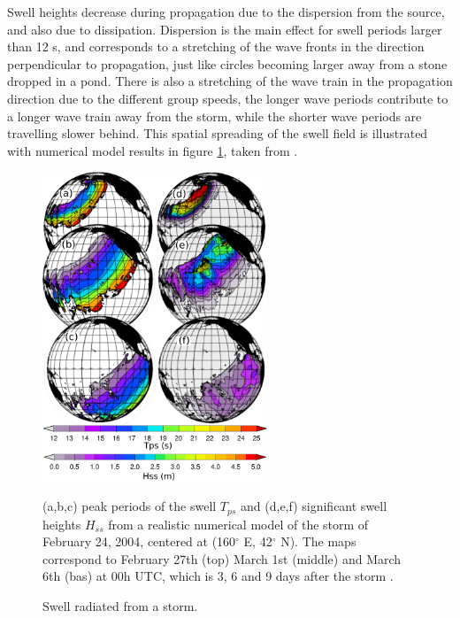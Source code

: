 Swell heights decrease during propagation due 
to the dispersion from the source, and also due to dissipation. Dispersion is the main effect for swell periods larger than 12 s, 
and corresponds to a stretching of the wave fronts in the direction perpendicular to propagation, just like circles becoming larger 
away from a stone dropped in a pond. There is also a stretching of the wave train in the propagation direction due to the different group 
speeds, the longer wave periods contribute to a longer wave train away from the storm, while the shorter wave periods are travelling 
slower behind. This spatial spreading of the swell field is illustrated with numerical model results in 
figure \ref{reconst_champ}, taken from \cite{Delpey&al.2010}. 
\begin{figure}[htb]
\centerline{\includegraphics[width=0.6\textwidth]{FIGS_CH_FETCH/partition_globes_small.pdf}}
 \caption{Swell radiated from a storm.}{(a,b,c) peak periods of the swell $T_{ps}$ and (d,e,f) significant swell heights  $H_{ss}$ 
from a realistic numerical model of the storm of February 24, 2004, centered at (160$^{\circ}$ E, 42$^{\circ}$ N). 
The maps correspond to  February 27th (top) 
 March 1st (middle) and March 6th (bas) at 00h UTC, which is 3, 6 and 9 days after the storm \citep[reproduced from][]{Delpey&al.2010}.\label{reconst_champ} }
\end{figure}
